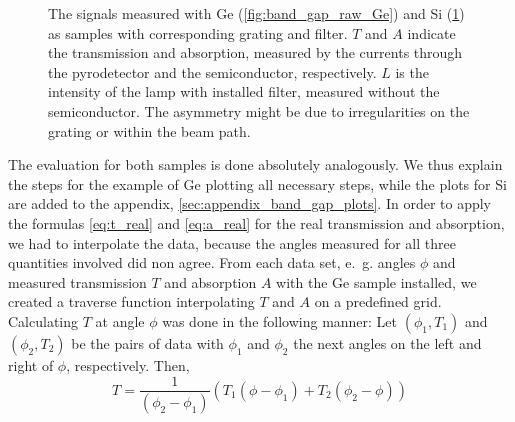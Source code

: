 \begin{figure}
\begin{subfigure}[b]{\pltw}
        \caption{}
        \label{fig:band_gap_raw_Si}
    \end{subfigure}
    \caption{
        The signals measured with Ge (\ref{fig:band_gap_raw_Ge}) 
        and Si (\ref{fig:band_gap_raw_Si}) as samples with corresponding 
        grating and filter. $T$ and $A$ indicate 
        the transmission and absorption, measured by the currents through 
        the pyrodetector and the semiconductor, respectively. 
        $L$ is the intensity of the lamp with installed filter, measured 
        without the semiconductor. The asymmetry might be due to 
        irregularities on the grating or within the beam path. 
        }
    \label{fig:band_gap}
\end{figure}

The evaluation for both samples is done 
absolutely analogously. We thus explain the steps for the example 
of Ge plotting all necessary steps, while the plots for 
Si are added to the appendix, \ref{sec:appendix_band_gap_plots}.
In order to apply the formulas \eqref{eq:t_real} and \eqref{eq:a_real}
for the real transmission and absorption, we had to interpolate the data, 
because the angles measured for all three quantities involved did 
non agree. From each data set, e.~g. angles $\phi$ and measured transmission $T$ 
and absorption $A$ with the Ge sample installed, we created a traverse function 
interpolating $T$ and $A$ on a predefined grid. 
Calculating $T$ at angle $\phi$ was done in the following manner:
Let $(\phi_1, T_1)$ and 
$(\phi_2, T_2)$ be the pairs of data with $\phi_1$ and $\phi_2$ the 
next angles on the left and right of $\phi$, respectively. 
Then, 
\begin{equation}
    T = \frac{1}{(\phi_2 - \phi_1)} 
        \left(T_1\left(\phi - \phi_1\right) + T_2\left(\phi_2 - \phi\right)\right)
\end{equation}

